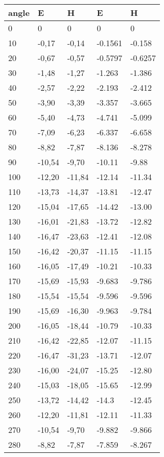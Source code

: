 \begin{table*}[!ht]
\begin{tabular}{|l|l|l|l|l|}
angle & E & H & E & H \\ \hline
0 & 0 & 0 & 0  & 0 \\ \hline
10 & -0,17 & -0,14 & -0.1561 & -0.158 \\ \hline
20 & -0,67 & -0,57 & -0.5797 & -0.6257 \\ \hline
30 & -1,48 & -1,27 & -1.263 & -1.386 \\ \hline
40 & -2,57 & -2,22 & -2.193 & -2.412 \\ \hline
50 & -3,90 & -3,39 & -3.357 & -3.665 \\ \hline
60 & -5,40 & -4,73 & -4.741 & -5.099 \\ \hline
70 & -7,09 & -6,23 & -6.337 & -6.658 \\ \hline
80 & -8,82 & -7,87 & -8.136 & -8.278 \\ \hline
90 & -10,54 & -9,70 & -10.11 & -9.88 \\ \hline
100 & -12,20 & -11,84 & -12.14 & -11.34 \\ \hline
110 & -13,73 & -14,37 & -13.81 & -12.47 \\ \hline
120 & -15,04 & -17,65 & -14.42 & -13.00 \\ \hline
130 & -16,01 & -21,83 & -13.72 & -12.82 \\ \hline
140 & -16,47 & -23,63 & -12.41 & -12.08 \\ \hline
150 & -16,42 & -20,37 & -11.15 & -11.15 \\ \hline
160 & -16,05 & -17,49 & -10.21 & -10.33 \\ \hline
170 & -15,69 & -15,93 & -9.683 & -9.786 \\ \hline
180 & -15,54 & -15,54 & -9.596 & -9.596 \\ \hline
190 & -15,69 & -16,30 & -9.963 & -9.784 \\ \hline
200 & -16,05 & -18,44 & -10.79 & -10.33 \\ \hline
210 & -16,42 & -22,85 & -12.07 & -11.15 \\ \hline
220 & -16,47 & -31,23 & -13.71 & -12.07 \\ \hline
230 & -16,00 & -24,07 & -15.25 & -12.80 \\ \hline
240 & -15,03 & -18,05 & -15.65 & -12.99 \\ \hline
250 & -13,72 & -14,42 & -14.3 & -12.45 \\ \hline
260 & -12,20 & -11,81 & -12.11 & -11.33 \\ \hline
270 & -10,54 & -9,70 & -9.882 & -9.866 \\ \hline
280 & -8,82 & -7,87 & -7.859 & -8.267 \\ \hline

\end{tabular}
\end{table*}
